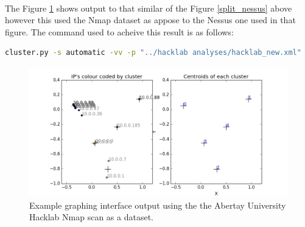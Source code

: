 \paragraph{}The Figure \ref{split_nmap} shows output to that similar of the Figure \ref{split_nessus} above however this used the Nmap dataset as appose to the Nessus one used in that figure. The command used to acheive this result is as follows:
\begin{lstlisting}[language=bash]
cluster.py -s automatic -vv -p "../hacklab analyses/hacklab_new.xml"
\end{lstlisting}
\begin{figure}[!h]
\centering
\includegraphics[width=5.5in]{./Figures/split_nmap.png}
\caption{Example graphing interface output using the the Abertay University Hacklab Nmap scan as a dataset.}
\label{split_nmap}
\end{figure}

